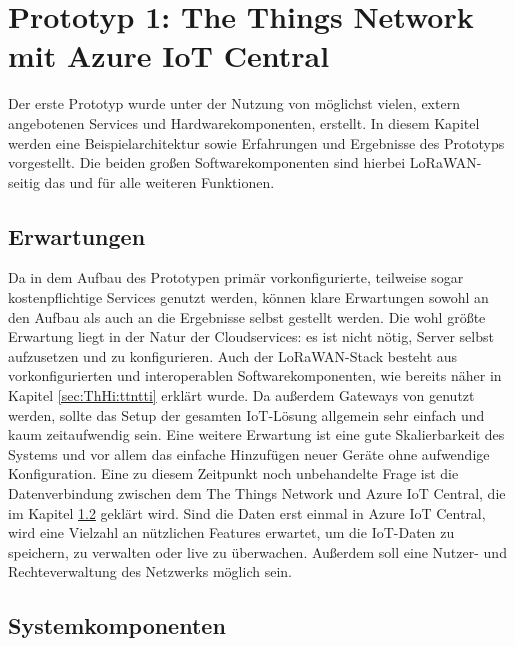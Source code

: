 \clearpage

\section{Prototyp 1: The Things Network mit Azure IoT Central}
\label{sec:Prot:version1}

Der erste Prototyp wurde unter der Nutzung von möglichst vielen, extern angebotenen Services und Hardwarekomponenten, erstellt. In diesem Kapitel werden eine Beispielarchitektur sowie Erfahrungen und Ergebnisse des Prototyps vorgestellt. Die beiden großen Softwarekomponenten sind hierbei LoRaWAN-seitig das  und  für alle weiteren Funktionen.

\subsection{Erwartungen}
\label{sec:Prot:erwartungen1}

Da in dem Aufbau des Prototypen primär vorkonfigurierte, teilweise sogar kostenpflichtige Services genutzt werden, können klare Erwartungen sowohl an den Aufbau als auch an die Ergebnisse selbst gestellt werden. Die wohl größte Erwartung liegt in der Natur der Cloudservices: es ist nicht nötig, Server selbst aufzusetzen und zu konfigurieren. Auch der LoRaWAN-Stack besteht aus vorkonfigurierten und interoperablen Softwarekomponenten, wie bereits näher in Kapitel \ref{sec:ThHi:ttntti} erklärt wurde. Da außerdem Gateways von  genutzt werden, sollte das Setup der gesamten IoT-Lösung allgemein sehr einfach und kaum zeitaufwendig sein. Eine weitere Erwartung ist eine gute Skalierbarkeit des Systems und vor allem das einfache Hinzufügen neuer Geräte ohne aufwendige Konfiguration. Eine zu diesem Zeitpunkt noch unbehandelte Frage ist die Datenverbindung zwischen dem The Things Network und Azure IoT Central, die im Kapitel \ref{sec:Prot:systemkomponenten1} geklärt wird. Sind die Daten erst einmal in Azure IoT Central, wird eine Vielzahl an nützlichen Features erwartet, um die IoT-Daten zu speichern, zu verwalten oder live zu überwachen. Außerdem soll eine Nutzer- und Rechteverwaltung des Netzwerks möglich sein.

\subsection{Systemkomponenten}
\label{sec:Prot:systemkomponenten1}

